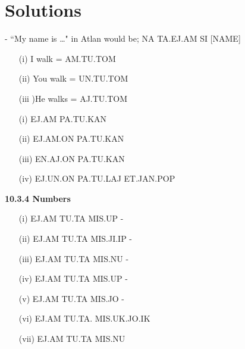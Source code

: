  

\section{Solutions}
\small

 -  “My name is …" in Atlan would be; NA TA.EJ.AM SI [NAME] \na \ta\ej\am \si {}. 

 

\begin{itemize}
    \item[(i)]I walk = AM.TU.TOM \am\tu\tom 

    \item[(ii)]You walk = UN.TU.TOM \un\tu\tom 

    \item[(iii])He walks = AJ.TU.TOM \aj\tu\tom 
\end{itemize}
 




\begin{itemize}
    \item[(i)]  EJ.AM PA.TU.KAN \ej\am \pa\tu\kan 

    \item[(ii)] EJ.AM.ON PA.TU.KAN \ej\am\on \pa\tu\kan 

    \item[(iii)]EN.AJ.ON PA.TU.KAN \ej\aj\on \pa\tu\kan 

    \item[(iv)]EJ.UN.ON PA.TU.LAJ ET.JAN.POP 
\item[] \ej\un\on \pa\tu\laj  \et\jan\pop 
\end{itemize}

\noindent \textbf{10.3.4 Numbers} 
\begin{itemize}
    \item[(i)]EJ.AM TU.TA MIS.UP - \ej\am \tu\ta \mis\up 

    \item[(ii)]EJ.AM TU.TA MIS.JI.IP - \ej\am \tu\ta \mis\ji\ip 

    \item[(iii)]EJ.AM TU.TA MIS.NU - \ej\am \tu\ta \mis\nu 

\item[(iv)] EJ.AM TU.TA MIS.UP  - \ej\am \tu\ta \mis\up 

    \item[(v)] EJ.AM TU.TA MIS.JO - \ej\am \tu\ta \mis\jo 

    \item[(vi)] EJ.AM TU.TA. MIS.UK.JO.IK 

\item[]\ej\am \tu\ta \mis\uk\jo\ik 

    \item[(vii)] EJ.AM TU.TA MIS.NU \ej\am \tu\ta \mis\nu
\end{itemize}
